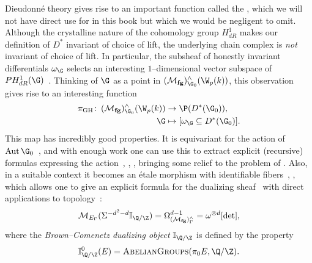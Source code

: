 \begin{remark}\label{ThePeriodMapSection}
Dieudonn\'e theory gives rise to an important function called the , which we will not have direct use for in this book but which we would be negligent to omit.
Although the crystalline nature of the cohomology group \(H^1_{dR}\) makes our definition of \(D^*\) invariant of choice of lift, the underlying chain complex is \emph{not} invariant of choice of lift.
In particular, the subsheaf of honestly invariant differentials \(\omega_{\G}\) selects an interesting \(1\)--dimensional vector subspace of \(PH^1_{dR}(\G)\)~\cite[Section 2.3]{MoravaCobordismComodules}.
Thinking of \(\G\) as a point in \((\moduli{fg})^\wedge_{\G_0}(\W_p(k))\), this observation gives rise to an interesting function
\begin{align*}
\pi_{\mathrm{GH}}\co (\moduli{fg})^\wedge_{\G_0}(\W_p(k)) & \to \P(D^*(\G_0)), \\
\G & \mapsto [\omega_{\G} \subseteq D^*(\G_0)].
\end{align*}
This map has incredibly good properties.
It is equivariant for the action of \(\Aut \G_0\)~\cite[Theorem 1]{HopkinsGrossAnnouncement}, and with enough work one can use this to extract explicit (recursive) formulas expressing the action~\cite{DevinatzHopkins}, \cite[Section 24]{StricklandFPFP}, \cite[Section 22]{HopkinsGrossEquivVBs}, bringing some relief to the problem of .
Also, in a suitable context it becomes an \'etale morphism with identifiable fibers~\cite[Theorem 1]{HopkinsGrossAnnouncement}, \cite[Sections 23-4]{HopkinsGrossEquivVBs}, which allows one to give an explicit formula for the dualizing sheaf~\cite[Corollary 3]{HopkinsGrossAnnouncement} with direct applications to topology~\cite[Theorem 6]{HopkinsGrossAnnouncement}: \[\context{E_\Gamma}(\Susp^{-d^2 - d} \mathbb I_{\Q/\Z}) = \Omega^{d - 1}_{(\moduli{fg})^\wedge_\Gamma} = \omega^{\otimes d}[\det],\] where the \textit{Brown--Comenetz dualizing object} \(\mathbb I_{\Q/\Z}\) is defined by the property \[\mathbb I_{\Q/\Z}^0(E) = \CatOf{AbelianGroups}(\pi_0 E, \Q/\Z).\]


\end{remark}
